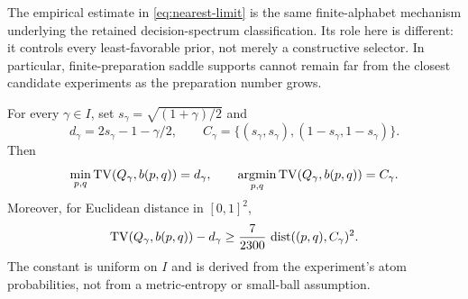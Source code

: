 The empirical estimate in \eqref{eq:nearest-limit} is the same
finite-alphabet mechanism underlying the retained decision-spectrum
classification. Its role here is different: it controls every
least-favorable prior, not merely a constructive selector. In particular,
finite-preparation saddle supports cannot remain far from the closest
candidate experiments as the preparation number grows.

\begin{theorem}
\label{thm:marked-contact-geometry}
For every $\gamma\in I$, set $s_\gamma=\sqrt{(1+\gamma)/2}$ and
\[
 d_\gamma=2s_\gamma-1-\gamma/2,\qquad
 C_\gamma=\{(s_\gamma,s_\gamma),(1-s_\gamma,1-s_\gamma)\}.
\]
Then
\begin{equation}\label{eq:marked-distance}
 \min_{p,q}\operatorname{TV}(Q_\gamma,b(p,q))=d_\gamma,
 \qquad \mathop{\rm argmin}_{p,q}\operatorname{TV}(Q_\gamma,b(p,q))=C_\gamma.
\end{equation}
Moreover, for Euclidean distance in $[0,1]^2$,
\begin{equation}\label{eq:intrinsic-growth}
 \operatorname{TV}(Q_\gamma,b(p,q))-d_\gamma
 \ge\frac7{2300}\,\operatorname{dist}((p,q),C_\gamma)^2.
\end{equation}
The constant is uniform on $I$ and is derived from the experiment's
atom probabilities, not from a metric-entropy or small-ball assumption.
\end{theorem}
